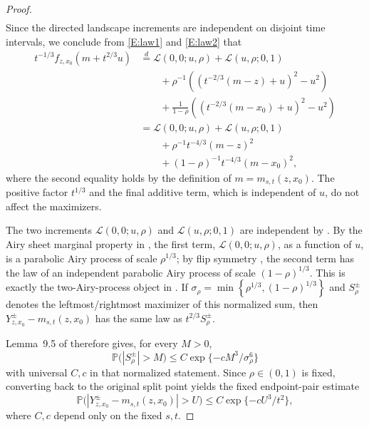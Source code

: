 \documentclass[12pt, reqno]{amsart}
\numberwithin{equation}{section}
\theoremstyle{definition}
\newcommand{\Prob}{\mathbb{P}}
\newcommand{\Lcal}{\mathcal{L}}
\begin{document}
\begin{proof}
\begin{align}
  \end{align}
  Since the directed landscape increments are independent on disjoint time
  intervals, we conclude from \eqref{E:law1} and \eqref{E:law2} that
  \begin{align*}
    t^{-1/3}f_{z,x_0}(m+t^{2/3}u)
    & \overset{d}{=} \Lcal(0,0;u,\rho)+\Lcal(u, \rho; 0,1)             \\
    & \qquad + \rho^{-1}\left((t^{-2/3}(m-z)+u)^2-u^2\right)           \\
    & \qquad + \frac{1}{1-\rho}\left((t^{-2/3}(m-x_0)+u)^2- u^2\right) \\
    & =\Lcal(0,0;u,\rho)+\Lcal(u, \rho; 0,1)                           \\
    & \qquad + \rho^{-1}t^{-4/3}(m-z)^2\\
    & \qquad + (1-\rho)^{-1}t^{-4/3}(m-x_0)^2,
  \end{align*}
  where the second equality holds by the definition of $m=m_{s,t}(z,x_0)$.
  The positive factor $t^{1/3}$ and the final additive term, which is independent
  of $u$, do not affect the maximizers.

  The two increments $\Lcal(0,0;u,\rho)$ and $\Lcal(u, \rho; 0,1)$ are
  independent by \cite[Definition~10.1(II)]{dauvergne.ortmann.ea:22:directed}.
  By the Airy sheet marginal property in \cite[Definition
  10.1(I)]{dauvergne.ortmann.ea:22:directed}, the first term,
  $\Lcal(0,0;u,\rho)$, as a function of $u$, is a parabolic Airy process of
  scale $\rho^{1/3}$; by flip symmetry
  \cite[Lemma~10.2(3)]{dauvergne.ortmann.ea:22:directed}, the second term has
  the law of an independent parabolic Airy process of scale $(1-\rho)^{1/3}$.
  This is exactly the two-Airy-process object in
  \cite[Lemma~9.5]{dauvergne.ortmann.ea:22:directed}.  If $\sigma_\rho =
  \min\left\{\rho^{1/3}, (1-\rho)^{1/3}\right\}$ and $S^\pm_\rho$ denotes the
  leftmost/rightmost maximizer of this normalized sum, then
  $Y^\pm_{z,x_0}-m_{s,t}(z,x_0)$ has the same law as $t^{2/3}S^\pm_\rho$.

  Lemma~9.5 of \cite{dauvergne.ortmann.ea:22:directed} therefore gives, for
  every $M>0$,
  \[
    \Prob\bigl(|S^\pm_{\rho}|>M\bigr)
    \le C\exp\{-cM^3/\sigma_\rho^6\}
  \]
  with universal $C,c$ in that normalized statement. Since $\rho \in (0,1)$ is
  fixed, converting back to the original split point yields the fixed
  endpoint-pair estimate
  \begin{equation}
    \Prob\bigl(|Y^\pm_{z,x_0}-m_{s,t}(z,x_0)|>U\bigr)
    \le C\exp\{-cU^3/t^2\},
    \label{E:fixed-pair-split-tail}
  \end{equation}
  where $C,c$ depend only on the fixed $s,t$.


\end{proof}
\end{document}
